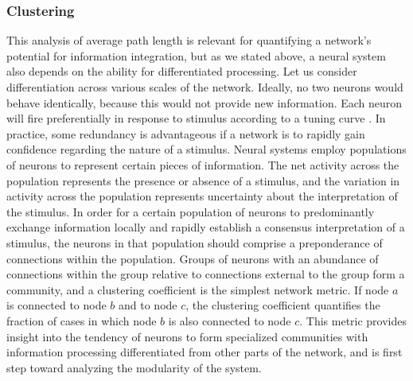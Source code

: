 \documentclass[twocolumn]{article}
\begin{document}
\subsubsection{Clustering}
This analysis of average path length is relevant for quantifying a network's potential for information integration, but as we stated above, a neural system also depends on the ability for differentiated processing. Let us consider differentiation across various scales of the network. Ideally, no two neurons would behave identically, because this would not provide new information. Each neuron will fire preferentially in response to stimulus according to a tuning curve \cite{daab2001}. In practice, some redundancy is advantageous if a network is to rapidly gain confidence regarding the nature of a stimulus. Neural systems employ populations of neurons to represent certain pieces of information. The net activity across the population represents the presence or absence of a stimulus, and the variation in activity across the population represents uncertainty about the interpretation of the stimulus. In order for a certain population of neurons to predominantly exchange information locally and rapidly establish a consensus interpretation of a stimulus, the neurons in that population should comprise a preponderance of connections within the population. Groups of neurons with an abundance of connections within the group relative to connections external to the group form a community, and a clustering coefficient \cite{eskn2014,fa2007} is the simplest network metric. If node $a$ is connected to node $b$ and to node $c$, the clustering coefficient quantifies the fraction of cases in which node $b$ is also connected to node $c$. This metric provides insight into the tendency of neurons to form specialized communities with information processing differentiated from other parts of the network, and is first step toward analyzing the modularity of the system. 
\end{document}
